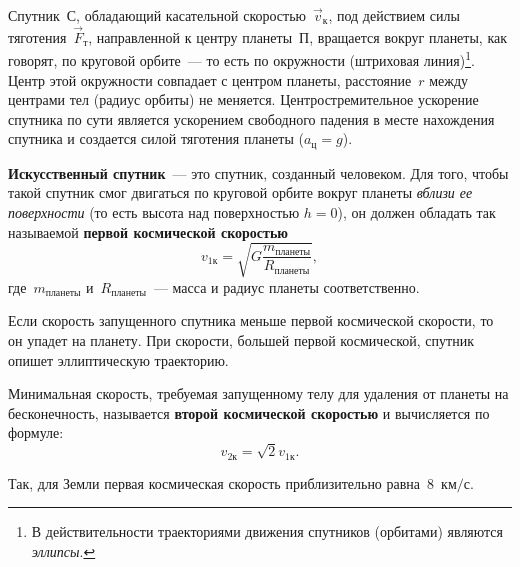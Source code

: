 \documentclass[main.tex]{subfiles}
\begin{document}
Спутник~С, обладающий касательной скоростью~$\vec v_\text{к}$, под действием силы тяготения~$\vec F_\text{т}$, направленной к центру планеты~П, вращается вокруг планеты, как говорят, по круговой орбите~--- то есть по окружности (штриховая линия)\footnote{В действительности траекториями движения спутников (орбитами) являются \emph{эллипсы}.}. Центр этой окружности совпадает с центром планеты, расстояние~$r$ между центрами тел (радиус орбиты) не меняется. Центростремительное ускорение спутника по сути является ускорением свободного падения в месте нахождения спутника и создается силой тяготения планеты ($a_\text{ц}=g$).

\textbf{Искусственный спутник}~--- это спутник, созданный человеком. Для того, чтобы такой спутник смог двигаться по круговой орбите вокруг планеты \emph{вблизи ее поверхности} (то есть высота над поверхностью $h=0$), он должен обладать так называемой \textbf{первой космической скоростью}
\begin{equation}
    v_\text{1к}=\sqrt{G\dfrac{m_\text{планеты}}{R_\text{планеты}}},
\end{equation}
где~$m_\text{планеты}$ и~$R_\text{планеты}$~--- масса и радиус планеты соответственно.


Если скорость запущенного спутника меньше первой космической скорости, то он упадет на планету. При скорости, большей первой космической, спутник опишет эллиптическую траекторию. 

Минимальная скорость, требуемая запущенному телу для удаления от планеты на бесконечность, называется \textbf{второй космической скоростью} и вычисляется по формуле:
\begin{equation}
    v_\text{2к}=\sqrt{2}v_\text{1к}.
\end{equation}

Так, для Земли первая космическая скорость приблизительно равна~$8$~км$/$с.


 
\end{document}
